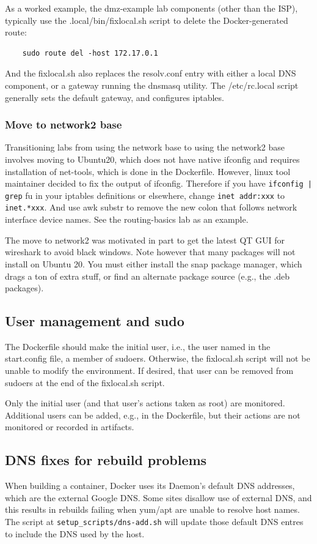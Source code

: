 \documentclass[12pt]{article}
\begin{document}
As a worked example, the dmz-example lab components (other than the ISP), typically use the .local/bin/fixlocal.sh script to 
delete the Docker-generated route:
\begin{verbatim}
    sudo route del -host 172.17.0.1
\end{verbatim}
\noindent And the fixlocal.sh also replaces the resolv.conf entry with either a local DNS component, or a gateway running
the dnsmasq utility.  The /etc/rc.local script generally sets the default gateway, and configures iptables.

\subsubsection{Move to network2 base}
Transitioning labs from using the network base to using the network2 base involves moving to Ubuntu20, which 
does not have native ifconfig and requires  installation of net-tools, which is done in the Dockerfile.  However,
linux tool maintainer decided to fix the output of ifconfig.  Therefore if you have {\tt ifconfig | grep} fu in your 
iptables definitions or elsewhere, change {\tt inet addr:xxx} to {\tt inet.*xxx}.  And use awk substr to remove
the new colon that follows network interface device names.  See the routing-basics lab as an example.  

The move to network2 was motivated in part to get the latest QT GUI for wireshark to avoid black windows.
Note however that many packages will not install on Ubuntu 20.  You must either install the snap package manager, 
which drags a ton of extra stuff, or find an alternate package source (e.g., the .deb packages).


\subsection{User management and sudo}
The Dockerfile should make the initial user, i.e., the user named in the start.config file, a member of sudoers.
Otherwise, the fixlocal.sh script will not be unable to modify the environment.  If desired, that user can be
removed from sudoers at the end of the fixlocal.sh script.

Only the initial user (and that user's actions taken as root) are monitored.  Additional users can be added,
e.g., in the Dockerfile, but their actions are not monitored or recorded in artifacts.

\subsection{DNS fixes for rebuild problems}
\label{DNS-rebuild}
When building a container, Docker uses its Daemon's default DNS addresses, which are the external Google DNS.
Some sites disallow use of external DNS, and this results in rebuilds failing when yum/apt are unable to resolve 
host names.  The script at {\tt setup\_scripts/dns-add.sh} will update those default DNS entres to include the
DNS used by the host.
\end{document}
